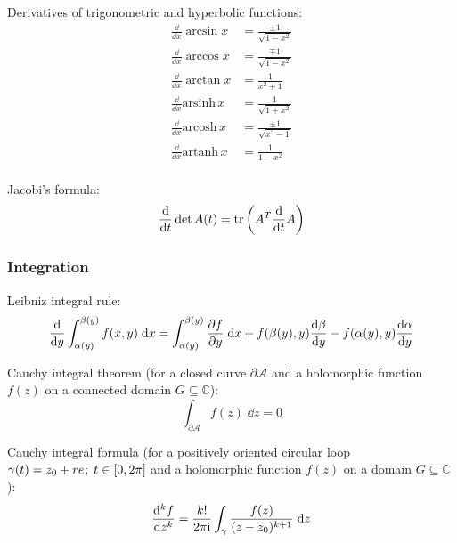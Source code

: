 			\noindent
			Derivatives of trigonometric and hyperbolic functions:
			\begin{equation}
				\begin{split}
					\frac{\dd}{\dd x}\arcsin x &= \frac{\pm 1}{\sqrt{1-x^2}} \\
					\frac{\dd}{\dd x}\arccos x &= \frac{\mp 1}{\sqrt{1-x^2}} \\
					\frac{\dd}{\dd x}\arctan x &= \frac{1}{x^2+1} \\
					\frac{\dd}{\dd x}\mathrm{arsinh}\,x &= \frac{1}{\sqrt{1+x^2}} \\
					\frac{\dd}{\dd x}\mathrm{arcosh}\,x &= \frac{\pm 1}{\sqrt{x^2-1}} \\
					\frac{\dd}{\dd x}\mathrm{artanh}\,x &= \frac{1}{1-x^2} \\
				\end{split}
			\end{equation}

			\noindent
			Jacobi's formula:
			\begin{equation}
				\dv{t}\det A(t) = \tr \qty(A^T \dv{t} A)
			\end{equation}

		\subsubsection{Integration}
			\noindent
			Leibniz integral rule:
			\begin{equation}
				\dv{y} \int_{\alpha(y)}^{\beta(y)}f(x,y)\;\dd x = \int_{\alpha(y)}^{\beta(y)} \pdv{f}{y}(x,y)\;\dd x + f(\beta(y),y)\dv{\beta}{y}(y)-f(\alpha(y),y)\dv{\alpha}{y}(y)
			\end{equation}

			\noindent
			Cauchy integral theorem (for a closed curve $\partial \mathcal{A}$ and a holomorphic function $f(z)$ on a connected domain $G \subseteq \mathbb{C}$):
			\begin{equation}
				\int_{\partial \mathcal{A}} f(z)\;\dd z = 0
			\end{equation}

			\noindent
			Cauchy integral formula (for a positively oriented circular loop $\gamma(t)=z_0+re^{\it};\;t\in[0,2\pi]$ and a holomorphic function $f(z)$ on a domain $G \subseteq \mathbb{C}$):
			\begin{equation}
				\dv[k]{f}{z}(z_0) = \frac{k!}{2\pi \mathrm{i}} \int_\gamma \frac{f(z)}{(z-z_0)^{k+1}}\;\dd z
			\end{equation}

